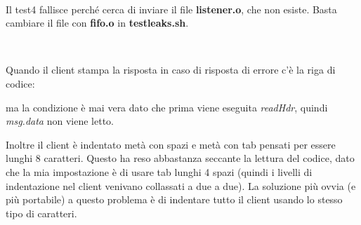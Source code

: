\documentclass[a4paper]{article}
\theoremstyle{theorem}
\theoremstyle{remark}
\theoremstyle{definition}
\theoremstyle{corollary}
\theoremstyle{lemma}
\newcommand\file[1]{%
	\textbf{#1}}
\newcommand\codeName[1]{%
	\textit{#1}}
\begin{document}
\

Il test4 fallisce perché cerca di inviare il file \file{listener.o}, che non esiste. Basta cambiare il file con \file{fifo.o} in \file{testleaks.sh}.
\

\

Quando il client stampa la risposta in caso di risposta di errore c'è la riga di codice:

ma la condizione è mai vera dato che prima viene eseguita \codeName{readHdr}, quindi \codeName{msg.data} non viene letto.

Inoltre il client è indentato metà con spazi e metà con tab pensati per essere lunghi 8 caratteri. Questo ha reso abbastanza seccante la lettura del codice, dato che la mia impostazione è di usare tab lunghi 4 spazi (quindi i livelli di indentazione nel client venivano collassati a due a due). La soluzione più ovvia (e più portabile) a questo problema è di indentare tutto il client usando lo stesso tipo di caratteri.
\end{document}
